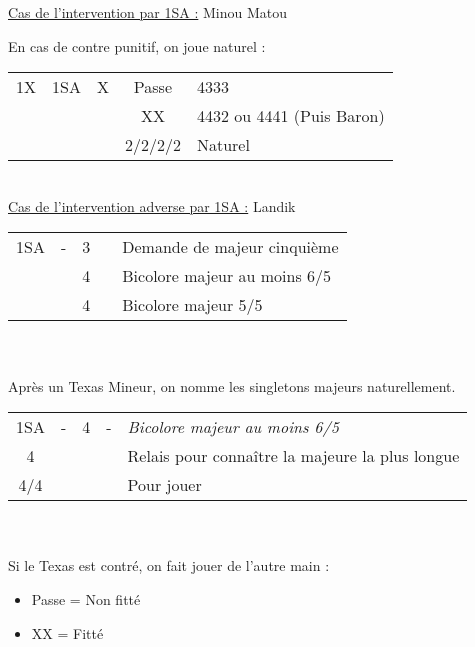 \documentclass[a4paper, oneside, 11pt]{report}
\begin{document}
	\underline{Cas de l'intervention par 1SA :} Minou Matou
	
	En cas de contre punitif, on joue naturel :\\
	\begin{tabular}{cccc|l}
	1X & 1SA & X & Passe & 4333\\
	&&& XX & 4432 ou 4441 (Puis Baron)\\
	&&& 2\trefle/2\carreau/2\coeur/2\pique & Naturel\\
	\end{tabular}\\
	
	\underline{Cas de l'intervention adverse par 1SA :} Landik\\

		\begin{tabular}{cccc|l}
		1SA & - & 3\carreau && Demande de majeur cinquième\\
		&& 4\trefle && Bicolore majeur au moins 6/5\\
		&& 4\carreau && Bicolore majeur 5/5\\
		\end{tabular}\\\\

		Après un Texas Mineur, on nomme les singletons majeurs naturellement.\\

		\begin{tabular}{cccc|l}
		1SA & - & 4\trefle & - & \it{Bicolore majeur au moins 6/5}\\
		4\carreau &&&& Relais pour connaître la majeure la plus longue\\
		4\coeur/4\pique &&&& Pour jouer\\
		\end{tabular}\\\\

		Si le Texas est contré, on fait jouer de l'autre main :
		\begin{itemize}
		\item Passe = Non fitté
		\item XX = Fitté\\
		\end{itemize}
		
\end{document}
